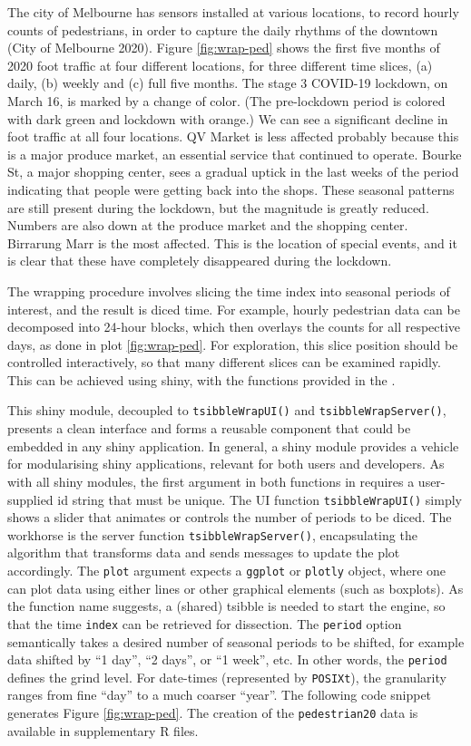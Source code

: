 The city of Melbourne has sensors installed at various locations, to record hourly counts of pedestrians, in order to capture the daily rhythms of the downtown (City of Melbourne 2020). Figure \ref{fig:wrap-ped} shows the first five months of 2020 foot traffic at four different locations, for three different time slices, (a) daily, (b) weekly and (c) full five months. The stage 3 COVID-19 lockdown, on March 16, is marked by a change of color. (The pre-lockdown period is colored with dark green and lockdown with orange.) We can see a significant decline in foot traffic at all four locations. QV Market is less affected probably because this is a major produce market, an essential service that continued to operate. Bourke St, a major shopping center, sees a gradual uptick in the last weeks of the period indicating that people were getting back into the shops. These seasonal patterns are still present during the lockdown, but the magnitude is greatly reduced. Numbers are also down at the produce market and the shopping center. Birrarung Marr is the most affected. This is the location of special events, and it is clear that these have completely disappeared during the lockdown.

The wrapping procedure involves slicing the time index into seasonal periods of interest, and the result is diced time. For example, hourly pedestrian data can be decomposed into 24-hour blocks, which then overlays the counts for all respective days, as done in plot \ref{fig:wrap-ped}. For exploration, this slice position should be controlled interactively, so that many different slices can be examined rapidly. This can be achieved using shiny, with the functions provided in the .

This shiny module, decoupled to \texttt{tsibbleWrapUI()} and \texttt{tsibbleWrapServer()}, presents a clean interface and forms a reusable component that could be embedded in any shiny application. In general, a shiny module provides a vehicle for modularising shiny applications, relevant for both users and developers. As with all shiny modules, the first argument in both functions in  requires a user-supplied id string that must be unique. The UI function \texttt{tsibbleWrapUI()} simply shows a slider that animates or controls the number of periods to be diced. The workhorse is the server function \texttt{tsibbleWrapServer()}, encapsulating the algorithm that transforms data and sends messages to update the plot accordingly. The \texttt{plot} argument expects a \texttt{ggplot} or \texttt{plotly} object, where one can plot data using either lines or other graphical elements (such as boxplots). As the function name suggests, a (shared) tsibble is needed to start the engine, so that the time \texttt{index} can be retrieved for dissection. The \texttt{period} option semantically takes a desired number of seasonal periods to be shifted, for example data shifted by ``1 day'', ``2 days'', or ``1 week'', etc. In other words, the \texttt{period} defines the grind level. For date-times (represented by \texttt{POSIXt}), the granularity ranges from fine ``day'' to a much coarser ``year''. The following code snippet generates Figure \ref{fig:wrap-ped}. The creation of the \texttt{pedestrian20} data is available in supplementary R files.

